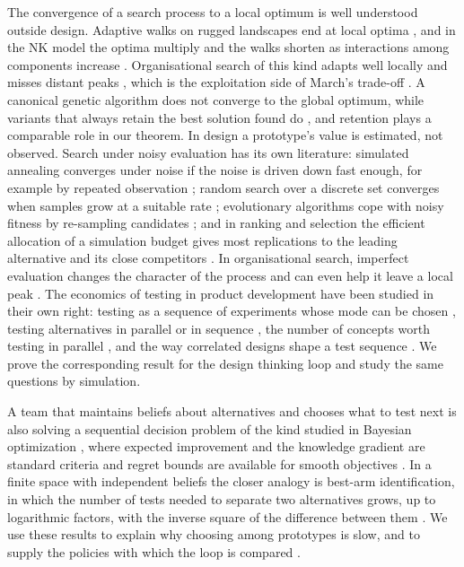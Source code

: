 \documentclass[10pt,twocolumn]{article}
\theoremstyle{definition}
\begin{document}
The convergence of a search process to a local optimum is well understood outside design. Adaptive walks on rugged landscapes end at local optima \citep{kauffmanlevin1987}, and in the NK model the optima multiply and the walks shorten as interactions among components increase \citep{kauffmanweinberger1989, kauffman1993}. Organisational search of this kind adapts well locally and misses distant peaks \citep{levinthal1997, levinthalmarch1993}, which is the exploitation side of March's trade-off \citep{march1991}. A canonical genetic algorithm does not converge to the global optimum, while variants that always retain the best solution found do \citep{rudolph1994}, and retention plays a comparable role in our theorem. In design a prototype's value is estimated, not observed. Search under noisy evaluation has its own literature: simulated annealing converges under noise if the noise is driven down fast enough, for example by repeated observation \citep{gutjahr1996}; random search over a discrete set converges when samples grow at a suitable rate \citep{homem2003}; evolutionary algorithms cope with noisy fitness by re-sampling candidates \citep{jin2005}; and in ranking and selection the efficient allocation of a simulation budget gives most replications to the leading alternative and its close competitors \citep{chen2000}. In organisational search, imperfect evaluation changes the character of the process and can even help it leave a local peak \citep{knudsen2007}. The economics of testing in product development have been studied in their own right: testing as a sequence of experiments whose mode can be chosen \citep{thomke1998}, testing alternatives in parallel or in sequence \citep{loch2001}, the number of concepts worth testing in parallel \citep{dahan2001}, and the way correlated designs shape a test sequence \citep{erat2008}. We prove the corresponding result for the design thinking loop and study the same questions by simulation.

A team that maintains beliefs about alternatives and chooses what to test next is also solving a sequential decision problem of the kind studied in Bayesian optimization \citep{jones1998, shahriari2016}, where expected improvement and the knowledge gradient \citep{frazier2008, frazier2009} are standard criteria and regret bounds are available for smooth objectives \citep{srinivas2012}. In a finite space with independent beliefs the closer analogy is best-arm identification, in which the number of tests needed to separate two alternatives grows, up to logarithmic factors, with the inverse square of the difference between them \citep{evendar2006, mannor2004, audibert2010}. We use these results to explain why choosing among prototypes is slow, and to supply the policies with which the loop is compared \citep{auer2002, russo2018}.
\end{document}
